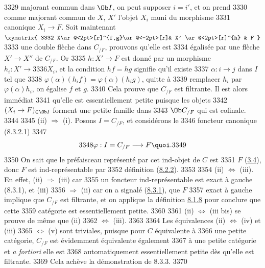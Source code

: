   3329	majorant commun dans $\Ob I$, on peut supposer $i=i'$, et on prend
  3330	comme majorant commun de $X$, $X'$ l'objet $X_i$ muni du morphisme
  3331	canonique $X_i\rightarrow F$. Soit maintenant $\xymatrix{
  3332	X\ar@<2pt>[r]^{f,g}\ar@<-2pt>[r]& X' \ar@<2pt>[r]^{h} & F }$
  3333	 une double flèche dans $C_{/F}$, prouvons qu'elle est
  3334	égalisée par une flèche $X'\rightarrow X''$ de $C_{/F}$. Or
  3335	$h:X'\rightarrow F$ est donné par un morphisme $h_i:X'\rightarrow
  3336	X_i$, et la condition $hf=hg$ signifie qu'il existe
  3337	$\alpha:i\rightarrow j$ dans $I$ tel que
  3338	$\varphi(\alpha)(h_if)=\varphi(\alpha)(h_ig)$, \ie quitte à
  3339	remplacer $h_i$ par $\varphi(\alpha)h_i$, on égalise $f$ et $g$.
  3340	Cela prouve que $C_{/F}$ est filtrante. Il est alors immédiat
  3341	qu'elle est essentiellement petite puisque les objets
  3342	$(X_i\rightarrow F)_{\in \Ob I}$ forment une petite famille dans
  3343	$\Ob C_{/F}$ qui est cofinale.
  3344	
  3345	(ii) $\Rightarrow$ (i). Posons $I=C_{/F}$, et considérons le
  3346	foncteur canonique (8.3.2.1)
  3347	$$
  3348	\varphi:I=C_{/F}\longrightarrow F{\quoi}.
  3349	$$
  3350	On sait que le préfaisceau représenté par cet ind-objet de $C$ est
  3351	$F$ (\hyperref[I.prop3.4]{3.4}), donc $F$ est ind-représentable par
  3352	définition (\hyperref[I.sec8.2.2]{8.2.2}).
  3353	
  3354	(ii) $\Leftrightarrow$ (iii). En effet, (ii) $\Rightarrow$ (iii) car
  3355	un foncteur ind-représentable est exact à gauche (8.3.1), et (iii)
  3356	$\Rightarrow$ (ii) car on a signalé (\hyperref[I.prop8.3.1]{8.3.1}), que $F$
  3357	exact à gauche implique que $C_{/F}$ est filtrante, et	on applique la définition \hyperref[I.def8.1.8]{8.1.8} pour conclure que cette
  3359	catégorie est essentiellement petite.
  3360	
  3361	(ii) $\Leftrightarrow$ (iii bis) se prouve de même que (ii)
  3362	$\Leftrightarrow$ (iii).
  3363	
  3364	Les équivalences (ii) $\Leftrightarrow$ (iv) et (iii)
  3365	$\Leftrightarrow$ (v) sont triviales, puisque pour $C$ équivalente à
  3366	une petite catégorie, $C_{/F}$ est évidemment équivalente également
  3367	à une petite catégorie et \textit{a fortiori} elle est
  3368	automatiquement essentiellement petite dès qu'elle est filtrante.
  3369	Cela achève la démonstration de 8.3.3.
  3370	

